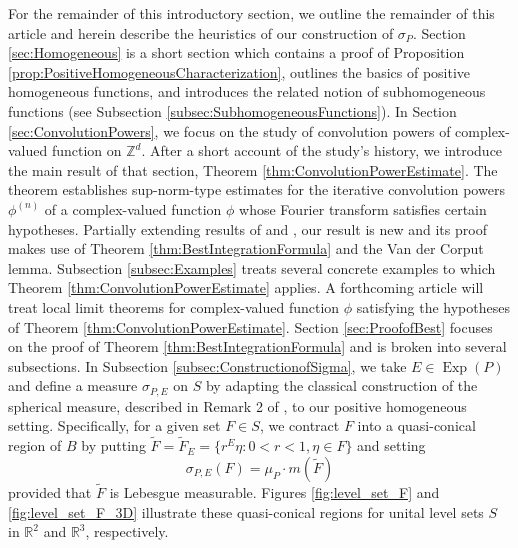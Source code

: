 \documentclass[smallextended]{svjour3}
\theoremstyle{remark}
\newcommand\Exp{\operatorname{Exp}}
\begin{document}
\noindent For the remainder of this introductory section, we outline the remainder of this article and herein describe the heuristics of our construction of $\sigma_P$. Section \ref{sec:Homogeneous} is a short section which contains a proof of Proposition \ref{prop:PositiveHomogeneousCharacterization}, outlines the basics of positive homogeneous functions, and introduces the related notion of subhomogeneous functions (see Subsection \ref{subsec:SubhomogeneousFunctions}). In Section \ref{sec:ConvolutionPowers}, we focus on the study of convolution powers of complex-valued function on $\mathbb{Z}^d$. After a short account of the study's history, we introduce the main result of that section, Theorem \ref{thm:ConvolutionPowerEstimate}. The theorem establishes sup-norm-type estimates for the iterative convolution powers $\phi^{(n)}$ of a complex-valued function $\phi$ whose Fourier transform satisfies certain hypotheses. Partially extending results of \cite{randles_convolution_2015} and \cite{randles_convolution_2017}, our result is new and its proof makes use of Theorem \ref{thm:BestIntegrationFormula} and the Van der Corput lemma. Subsection \ref{subsec:Examples} treats several concrete examples to which Theorem \ref{thm:ConvolutionPowerEstimate} applies. A forthcoming article will treat local limit theorems for complex-valued function $\phi$ satisfying the hypotheses of Theorem \ref{thm:ConvolutionPowerEstimate}. Section \ref{sec:ProofofBest} focuses on the proof of Theorem \ref{thm:BestIntegrationFormula} and is broken into several subsections. In Subsection \ref{subsec:ConstructionofSigma}, we take $E\in\Exp(P)$ and define a measure $\sigma_{P,E}$ on $S$ by adapting the classical construction of the spherical measure, described in Remark 2 of \cite{folland_how_2001}, to our positive homogeneous setting. Specifically, for a given set $F\in S$, we contract $F$ into a quasi-conical region of $B$ by putting $\widetilde{F}=\widetilde{F}_E=\{r^E\eta:0<r<1,\eta\in F\}$
and setting
\begin{equation*}
\sigma_{P,E}(F)=\mu_P \cdot m(\widetilde{F})
\end{equation*}
provided that $\widetilde{F}$ is Lebesgue measurable. Figures \ref{fig:level_set_F} and \ref{fig:level_set_F_3D} illustrate these quasi-conical regions for unital level sets $S$ in $\mathbb{R}^2$ and $\mathbb{R}^3$, respectively.\\
\end{document}
